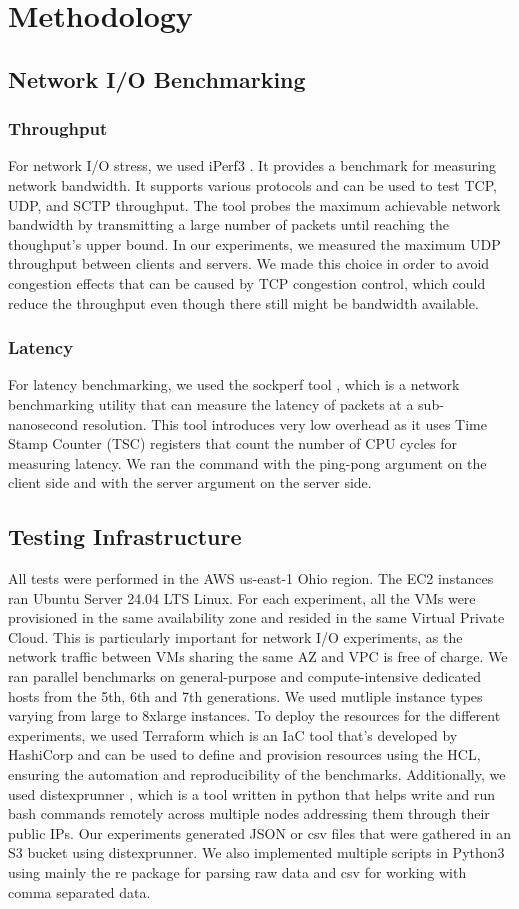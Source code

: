 \chapter{Methodology}

\section{Network I/O Benchmarking}
\subsection{Throughput}
For network I/O stress, we used iPerf3 \cite{iperf}. It provides a benchmark for measuring network 
bandwidth. It supports various protocols and can be used to test TCP, UDP, and SCTP 
throughput.  The tool probes the maximum achievable network bandwidth by transmitting a large number 
of packets until reaching the thoughput's upper bound. In our experiments, we measured the 
maximum UDP throughput between clients and servers. We made this choice in order to avoid congestion 
effects that can be caused by TCP congestion control, which could reduce the throughput even though 
there still might be bandwidth available. 
\subsection{Latency}
For latency benchmarking, we used the sockperf tool \cite{sockperf}, which is a network benchmarking 
utility that can measure the latency of packets at a sub-nanosecond resolution. 
This tool introduces very low overhead as it uses Time Stamp Counter (TSC) registers that count 
the number of CPU cycles for measuring latency. We ran the command with the ping-pong argument on the 
client side and with the server argument on the server side.

\section{Testing Infrastructure}
All tests were performed in the AWS us-east-1 Ohio region. The EC2 instances ran Ubuntu Server 24.04 LTS
Linux. For each experiment, all the VMs were provisioned in the same availability zone and resided
in the same Virtual Private Cloud. This is particularly important for network I/O experiments, as 
the network traffic between VMs sharing the same AZ and VPC is free of charge. We ran parallel 
benchmarks on general-purpose and compute-intensive dedicated hosts from the 5th, 6th 
and 7th generations. We used mutliple instance types varying from large to 8xlarge instances.
To deploy the resources for the different experiments, we used Terraform which is an \ac{IaC} tool 
that's developed by HashiCorp and can be used to define and provision resources using the \ac{HCL}, 
ensuring the automation and reproducibility of the benchmarks. 
Additionally, we used distexprunner \cite{distex}, which is a tool written in python 
that helps write and run bash commands remotely across multiple nodes addressing them through 
their public IPs. Our experiments generated JSON or csv files that were gathered in an S3 
bucket using distexprunner. We also implemented multiple scripts in Python3 using mainly the re 
package \cite{re} for parsing raw data and csv \cite{csv} for working with comma separated data.
